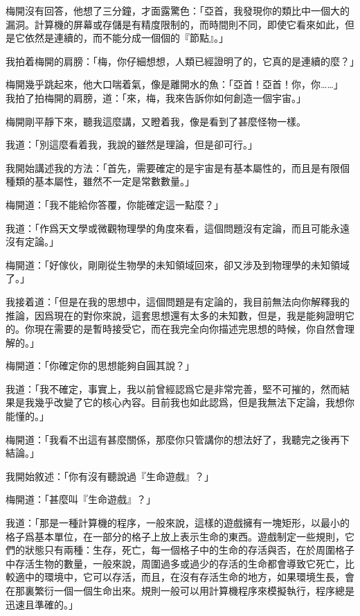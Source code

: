 梅開沒有回答，他想了三分鐘，才面露驚色：「亞首，我發現你的類比中一個大的漏洞。計算機的屏幕或存儲是有精度限制的，而時間則不同，即使它看來如此，但是它依然是連續的，而不能分成一個個的『節點』。」

我拍着梅開的肩膀：「梅，你仔細想想，人類已經證明了的，它真的是連續的麼？」

梅開幾乎跳起來，他大口喘着氣，像是離開水的魚：「亞首！亞首！你，你……」
\\


我拍了拍梅開的肩膀，道：「來，梅，我來告訴你如何創造一個宇宙。」

梅開剛平靜下來，聽我這麼講，又瞪着我，像是看到了甚麼怪物一樣。

我道：「別這麼看着我，我說的雖然是理論，但是卻可行。」

我開始講述我的方法：「首先，需要確定的是宇宙是有基本屬性的，而且是有限個種類的基本屬性，雖然不一定是常數數量。」

梅開道：「我不能給你答覆，你能確定這一點麼？」

我道：「作爲天文學或微觀物理學的角度來看，這個問題沒有定論，而且可能永遠沒有定論。」

梅開道：「好傢伙，剛剛從生物學的未知領域回來，卻又涉及到物理學的未知領域了。」

我接着道：「但是在我的思想中，這個問題是有定論的，我目前無法向你解釋我的推論，因爲現在的對你來說，這套思想還有太多的未知數，但是，我是能夠證明它的。你現在需要的是暫時接受它，而在我完全向你描述完思想的時候，你自然會理解的。」

梅開道：「你確定你的思想能夠自圓其說？」

我道：「我不確定，事實上，我以前曾經認爲它是非常完善，堅不可摧的，然而結果是我幾乎改變了它的核心內容。目前我也如此認爲，但是我無法下定論，我想你能懂的。」

梅開道：「我看不出這有甚麼關係，那麼你只管講你的想法好了，我聽完之後再下結論。」

我開始敘述：「你有沒有聽說過『生命遊戲』？」

梅開道：「甚麼叫『生命遊戲』？」

我道：「那是一種計算機的程序，一般來說，這樣的遊戲擁有一塊矩形，以最小的格子爲基本單位，在一部分的格子上放上表示生命的東西。遊戲制定一些規則，它們的狀態只有兩種：生存，死亡，每一個格子中的生命的存活與否，在於周圍格子中存活生物的數量，一般來說，周圍過多或過少的存活的生命都會導致它死亡，比較適中的環境中，它可以存活，而且，在沒有存活生命的地方，如果環境生長，會在那裏繁衍一個一個生命出來。規則一般可以用計算機程序來模擬執行，程序總是迅速且準確的。」


